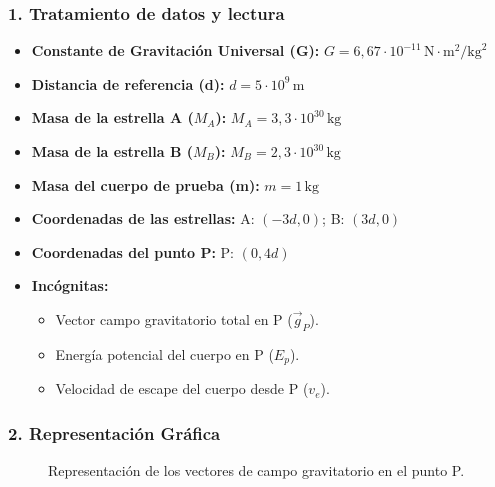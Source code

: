 \subsubsection*{1. Tratamiento de datos y lectura}
\begin{itemize}
    \item \textbf{Constante de Gravitación Universal (G):} $G = 6,67 \cdot 10^{-11} \, \text{N}\cdot\text{m}^2/\text{kg}^2$
    \item \textbf{Distancia de referencia (d):} $d = 5 \cdot 10^{9} \, \text{m}$
    \item \textbf{Masa de la estrella A ($M_A$):} $M_A = 3,3 \cdot 10^{30} \, \text{kg}$
    \item \textbf{Masa de la estrella B ($M_B$):} $M_B = 2,3 \cdot 10^{30} \, \text{kg}$
    \item \textbf{Masa del cuerpo de prueba (m):} $m = 1 \, \text{kg}$
    \item \textbf{Coordenadas de las estrellas:} A: $(-3d, 0)$; B: $(3d, 0)$
    \item \textbf{Coordenadas del punto P:} P: $(0, 4d)$
    \item \textbf{Incógnitas:}
    \begin{itemize}
        \item Vector campo gravitatorio total en P ($\vec{g}_P$).
        \item Energía potencial del cuerpo en P ($E_p$).
        \item Velocidad de escape del cuerpo desde P ($v_e$).
    \end{itemize}
\end{itemize}

\subsubsection*{2. Representación Gráfica}
\begin{figure}[H]
    \centering
    \caption{Representación de los vectores de campo gravitatorio en el punto P.}
\end{figure}

